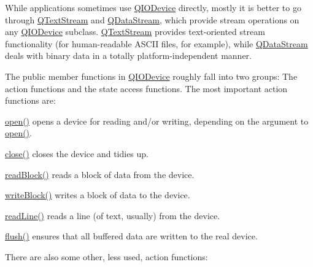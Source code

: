 While applications sometimes use \mbox{\hyperlink{class_q_i_o_device}{Q\+I\+O\+Device}} directly, mostly it is better to go through \mbox{\hyperlink{class_q_text_stream}{Q\+Text\+Stream}} and \mbox{\hyperlink{class_q_data_stream}{Q\+Data\+Stream}}, which provide stream operations on any \mbox{\hyperlink{class_q_i_o_device}{Q\+I\+O\+Device}} subclass. \mbox{\hyperlink{class_q_text_stream}{Q\+Text\+Stream}} provides text-\/oriented stream functionality (for human-\/readable A\+S\+C\+II files, for example), while \mbox{\hyperlink{class_q_data_stream}{Q\+Data\+Stream}} deals with binary data in a totally platform-\/independent manner.

The public member functions in \mbox{\hyperlink{class_q_i_o_device}{Q\+I\+O\+Device}} roughly fall into two groups\+: The action functions and the state access functions. The most important action functions are\+: 
\begin{DoxyItemize}
\item \mbox{\hyperlink{class_q_i_o_device_ae4046ae7bf4d4cee1010239973314e42}{open()}} opens a device for reading and/or writing, depending on the argument to \mbox{\hyperlink{class_q_i_o_device_ae4046ae7bf4d4cee1010239973314e42}{open()}}.


\item \mbox{\hyperlink{class_q_i_o_device_a01a9ddac5d964b5b6a1f10005bf28a4f}{close()}} closes the device and tidies up.


\item \mbox{\hyperlink{class_q_i_o_device_a71f10647e4bd98141f45362b9a06983a}{read\+Block()}} reads a block of data from the device.


\item \mbox{\hyperlink{class_q_i_o_device_a5d937df1bde2f956872dd54e077807d1}{write\+Block()}} writes a block of data to the device.


\item \mbox{\hyperlink{class_q_i_o_device_a4dc865ffcb5b7896ff8f9a1d828e4c0e}{read\+Line()}} reads a line (of text, usually) from the device.


\item \mbox{\hyperlink{class_q_i_o_device_a39eccb592ae076fbc42108a3d590fb43}{flush()}} ensures that all buffered data are written to the real device.


\end{DoxyItemize}There are also some other, less used, action functions\+: 
